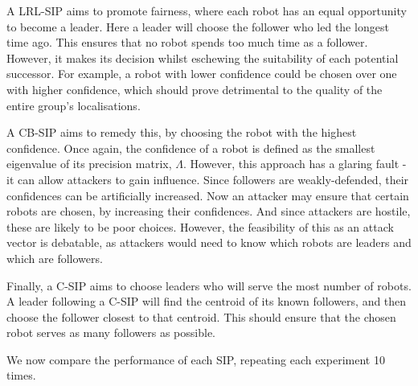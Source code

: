 A LRL-SIP aims to promote fairness, where each robot has an equal opportunity to become a leader. Here a leader will choose the follower who led the longest time ago. This ensures that no robot spends too much time as a follower. However, it makes its decision whilst eschewing the suitability of each potential successor. For example, a robot with lower confidence could be chosen over one with higher confidence, which should prove detrimental to the quality of the entire group's localisations.

A CB-SIP aims to remedy this, by choosing the robot with the highest confidence. Once again, the confidence of a robot is defined as the smallest eigenvalue of its precision matrix, $\Lambda$. However, this approach has a glaring fault - it can allow attackers to gain influence. Since followers are weakly-defended, their confidences can be artificially increased. Now an attacker may ensure that certain robots are chosen, by increasing their confidences. And since attackers are hostile, these are likely to be poor choices. However, the feasibility of this as an attack vector is debatable, as attackers would need to know which robots are leaders and which are followers.

Finally, a C-SIP aims to choose leaders who will serve the most number of robots. A leader following a C-SIP will find the centroid of its known followers, and then choose the follower closest to that centroid. This should ensure that the chosen robot serves as many followers as possible. 

We now compare the performance of each SIP, repeating each experiment 10 times.

